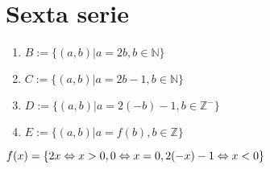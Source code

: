 \documentclass{article}
\begin{document}
\section{Sexta serie}

\begin{enumerate}
    \item $B:= \{(a,b)| a=2b, b \in \mathbb{N}\}$
    \item $C:= \{(a,b)|a = 2b-1, b \in \mathbb{N}\}$
    \item $D:= \{(a,b)|a = 2(-b)-1, b \in \mathbb{Z}^- \}$
    \item $E:= \{(a,b)|a=f(b),b\in \mathbb{Z} \}$
\end{enumerate}
\begin{center}
    $f(x)= \{ 2x \Leftrightarrow x>0, \\
    0 \Leftrightarrow x = 0,\\
    2(-x)-1 \Leftrightarrow x<0\}$
\end{center}
\end{document}
